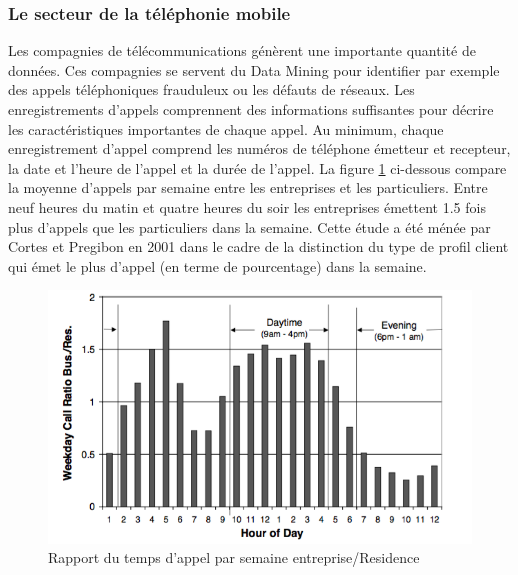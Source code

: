 \documentclass[11pt,a4paper]{report}
\begin{document}
 \subsubsection{Le secteur de la téléphonie mobile}
 Les compagnies de télécommunications génèrent une importante quantité de données. Ces compagnies se servent du Data Mining pour identifier par exemple des appels téléphoniques frauduleux ou les défauts de réseaux.
 Les enregistrements d'appels comprennent des informations suffisantes pour décrire les caractéristiques importantes de chaque appel. Au minimum, chaque enregistrement d'appel comprend les numéros de téléphone émetteur et recepteur, la date et l'heure de l'appel et la durée de l'appel.  La figure \ref{telephone} ci-dessous compare la moyenne d'appels par semaine entre les entreprises et les particuliers. Entre neuf heures du matin et quatre heures du soir les entreprises émettent 1.5 fois plus d'appels que les particuliers dans la semaine. Cette étude a été ménée par Cortes et Pregibon en 2001 dans le cadre de la distinction du type de profil client qui émet le plus d'appel (en terme de pourcentage) dans la semaine. \cite{tekephone_secteur}
%
%
%
 \begin{figure}[h]
   \centering
   \includegraphics[scale=0.5]{telephone.png}
      \caption{Rapport du temps d'appel par semaine entreprise/Residence}
      \label{telephone}
\end{figure}
\end{document}
